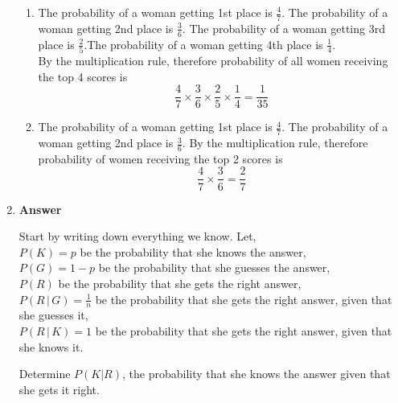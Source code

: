 \documentclass[12pt]{book}
\begin{document}
\begin{enumerate}
\begin{enumerate}
        \item The probability of a woman getting 1st place is $\frac{4}{7}$. The probability of a woman getting 2nd place is $\frac{3}{6}$. The probability of a woman getting 3rd place is $\frac{2}{5}$.The probability of a woman getting 4th place is $\frac{1}{4}$.\\
        By the multiplication rule, therefore probability of all women receiving the top 4 scores is
        $$\dfrac{4}{7} \times \dfrac{3}{6} \times \dfrac{2}{5} \times \dfrac{1}{4} = \dfrac{1}{35}$$
        
        \item The probability of a woman getting 1st place is $\frac{4}{7}$. The probability of a woman getting 2nd place is $\frac{3}{6}$. 
        By the multiplication rule, therefore probability of women receiving the top 2 scores is
        $$\dfrac{4}{7} \times \dfrac{3}{6} = \dfrac{2}{7}$$
    \end{enumerate}
    \item \textbf{Answer}
    
    Start by writing down everything we know. Let,\\
    $P(K) = p$ \hfill be the probability that she knows the answer, \\
    $P(G) = 1-p$ \hfill be the probability that she guesses the answer,\\
    $P(R)$ \hfill be the probability that she gets the right answer,\\
    $P(R\,|\,G)=\frac{1}{n}$ \hfill be the probability that she gets the right answer, given that she guesses it,\\
    $P(R\,|\,K)=1$ \hfill be the probability that she gets the right answer, given that she knows it.
    
    Determine $P(K|R)$, the probability that she knows the answer given that she gets it right.\\
    

\end{enumerate}
\end{document}
